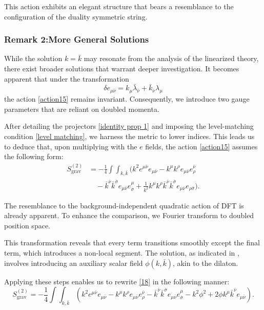 \documentclass[13pt]{article}
\begin{document}
This action exhibits an elegant structure that bears a resemblance to the configuration of the duality symmetric string.

\subsubsection*{Remark 2:More General Solutions}
While the solution $k = \bar{k}$ may resonate from the analysis of the linearized theory, there exist broader solutions that warrant deeper investigation. It becomes apparent that under the transformation
\begin{equation}
\delta e_{\mu \bar{\nu}} = k_{\mu}\bar{\lambda}_{\bar{\nu}} + \bar{k}_{\bar{\nu}}\lambda_{\mu} \tag{20}
\label{transformation}
\end{equation}
the action \eqref{action15} remains invariant. Consequently, we introduce two gauge parameters that are reliant on doubled momenta.

After detailing the projectors \eqref{identity prop 1} and imposing the level-matching condition \eqref{level matching}, we harness the metric to lower indices. This leads us to deduce that, upon multiplying with the $e$ fields, the action \eqref{action15} assumes the following form:
\begin{align}
S_{\text{grav}}^{(2)} &= -\frac{1}{4} \int \int_{k, \bar{k}} (k^{2}e^{\mu \bar{\nu}}e_{\mu \bar{\nu}} - k^{\mu}k^{\rho}e_{\mu \bar{\nu}}e^{\bar{\nu}}_{\rho} \nonumber \\
&\quad - \bar{k}^{\bar{\nu}}\bar{k}^{\bar{\sigma}}e_{\mu \bar{\nu}}e^{\mu}_{\bar{\sigma}} + \frac{1}{k^2}k^{\mu}k^{\rho}\bar{k}^{\bar{\nu}}\bar{k}^{\bar{\sigma}}e_{\mu \bar{\nu}}e_{\rho \bar{\sigma}}). \tag{18}
\label{18}
\end{align}

The resemblance to the background-independent quadratic action of DFT is already apparent. To enhance the comparison, we Fourier transform to doubled position space.

 This transformation reveals that every term transitions smoothly except the final term, which introduces a non-local segment. The solution, as indicated in \cite{D_az_Jaramillo_2022}, involves introducing an auxiliary scalar field $\phi(k, \bar{k})$, akin to the dilaton.

Applying these steps enables us to rewrite \eqref{18} in the following manner:
\begin{equation}
S_{\text{grav}}^{(2)} = -\frac{1}{4} \int \int_{k, \bar{k}} (k^{2}e^{\mu \bar{\nu}}e_{\mu \bar{\nu}} - k^{\mu}k^{\rho}e_{\mu \bar{\nu}}e^{\bar{\nu}}_{\rho} - \bar{k}^{\bar{\nu}}\bar{k}^{\bar{\sigma}}e_{\mu \bar{\nu}}e^{\mu}_{\bar{\sigma}} - k^2 \phi^2 + 2\phi k^{\mu}\bar{k}^{\bar{\nu}}e_{\mu \bar{\nu}}). \tag{19}
\label{19}
\end{equation}
\end{document}
